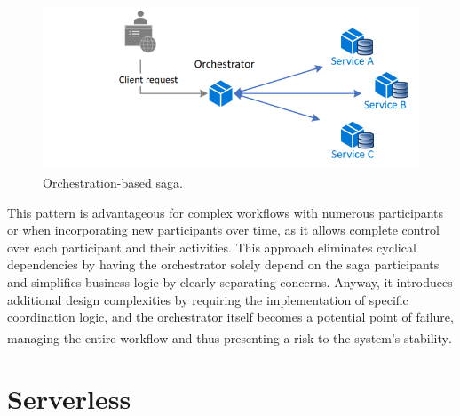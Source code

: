 \begin{figure}
    \centering
    \includegraphics[scale=0.55]{Pictures/3_orchestrator.png}
    \caption{Orchestration-based saga\textsuperscript{\cite{ms_sagas}}.}
    \label{fig:3_orchestration}
\end{figure}

This pattern is advantageous for complex workflows with numerous participants or when incorporating
new participants over time, as it allows complete control over each participant and their
activities. This approach eliminates cyclical dependencies by having the orchestrator solely depend
on the saga participants and simplifies business logic by clearly separating concerns. Anyway, it
introduces additional design complexities by requiring the implementation of specific coordination
logic, and the orchestrator itself becomes a potential point of failure, managing the entire
workflow and thus presenting a risk to the system's stability\textsuperscript{\cite{ms_sagas}}.

\section{Serverless}


